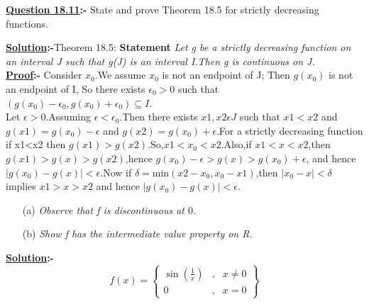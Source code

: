 \documentclass[12pt]{article}
\begin{document}
\vspace{1cm}

\begin{mdframed}[style=MyFrame]
\textbf{\underline{Question 18.11}:- } State and prove Theorem 18.5 for strictly decreasing functions.\\
\end{mdframed}
\vspace*{1cm}
\textbf{\underline{Solution}:-}Theorem 18.5: \textbf{Statement} \emph{Let g be a strictly decreasing function on an interval J such that g(J) is an interval I.Then g is continuous on J.}\\
\vspace*{.5cm}
\textbf{\underline{Proof}:-} Consider $x_0$.We assume $x_0$ is not an endpoint of J; Then $g(x_0)$ is not an endpoint of I, So there exists $\epsilon_0 > 0$ such that $(g(x_0)-\epsilon_0,g(x_0)+\epsilon_0)\subseteq{I}$.\\
Let $\epsilon>0$.Assuming $\epsilon<\epsilon_0$.Then there exists $x1,x2\epsilon J$ such that $x1<x2$ and $g(x1)=g(x_0)-\epsilon$ and $g(x2)=g(x_0)+\epsilon$.For a strictly decreasing function if x1<x2 then $g(x1)>g(x2)$.So,$x1<x_0<x2$.Also,if $x1<x<x2$,then $g(x1)>g(x)>g(x2)$,hence $g(x_0)-\epsilon >g(x)>g(x_0)+\epsilon$,
and hence $|g(x_0)-g(x)|<\epsilon$.Now if $\delta=$min$(x2-x_0,x_0-x1)$,then $|x_0-x|<\delta$ implies $x1>x>x2$ and hence $|g(x_0)-g(x)|<\epsilon$.

\vspace{1cm}

\begin{mdframed}[style=MyFrame]

\begin{itemize}
\item [(a)] \emph{Observe that f is discontinuous at $0$.}
	\item [(b)] \emph{Show f has the intermediate value property on R.}
\end{itemize}
\end{mdframed}
\vspace*{1cm}

\textbf{\underline{Solution}:-}
$$
f(x)=
\left\{
\begin{array}{lcr}
\sin\left(\frac{1}{x}\right) & , & x \neq 0 \\
0 & , & x=0
\end{array}\right\}
$$
\end{document}
